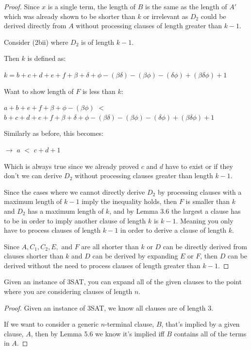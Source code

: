 \documentclass[manuscript]{acmart}
\begin{document}
\begin{proof}
        Since $x$ is a single term, the length of $B$ is the same as the length of $A'$ 
        which was already shown to be shorter than $k$ or irrelevant
        as $D_2$ could be derived directly from $A$ without processing
        clauses of length greater than $k-1$.

        Consider (2bii) where $D_2$ is of length $k - 1$.

        Then $k$ is defined as:

        $k = b + c + d + e + f + \beta + \delta + \phi - (\beta \delta) 
        - (\beta \phi) - (\delta \phi) + (\beta \delta \phi) + 1$

        Want to show length of $F$ is less than $k$:

        $a + b + e + f + \beta + \phi - (\beta \phi)$ $<$ 
        $b + c + d + e + f + \beta + \delta + \phi - (\beta \delta) 
        - (\beta \phi) - (\delta \phi) + (\beta \delta \phi) + 1$

        Similarly as before, this becomes:

        $\rightarrow$ $a$ $<$ $c + d + 1$

        Which is always true since we already proved $c$ and $d$ have to exist
        or if they don't we can derive $D_2$ without processing clauses
        greater than length $k-1$. 

        Since the cases where we cannot directly derive $D_2$ by processing
        clauses with a maximum length of $k-1$ imply the inequality holds, then
        $F$ is smaller than $k$ and $D_2$ has a maximum length of $k$, 
        and by Lemma 3.6 the largest a clause has to be in order to imply
        another clause of length $k$ is $k-1$. Meaning you only have to process
        clauses of length $k-1$ in order to derive a clause of length $k$.
        
        Since $A, C_1, C_2, E,$ and $F$ are all shorter than $k$ or
        $D$ can be directly derived from clauses shorter than $k$ 
        and $D$ can
        be derived by expanding $E$ or $F$, then $D$ can be derived 
        without the need to process clauses of length greater than $k - 1$.
    \end{proof}

    \begin{lemma}
        Given an instance of 3SAT, you can expand all of the given clauses
        to the point where you are considering clauses of length $n$.
    \end{lemma}
    \begin{proof}
        Given an instance of 3SAT, we know all clauses are of length 3.

        If we want to consider a generic $n$-terminal clause, $B$, that's implied by a
        given clause, $A$, then by Lemma 5.6 we know it's implied iff $B$ 
        contains all of the terms in $A$.
    \end{proof}
\end{document}
